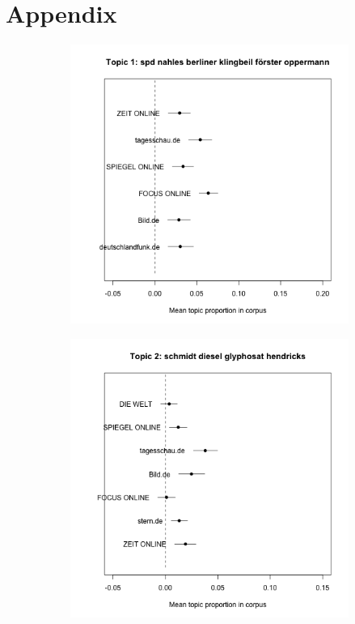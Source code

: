 \documentclass[12pt,a4paper,notitlepage]{article}
\begin{document}
\section*{Appendix}

\begin{figure}[H]
	\caption{Mean prevalence of topics within each news source corpus 1}
	\begin{center}
		\begin{subfigure}[normla]{0.2\textwidth}
			\includegraphics[width=\textwidth]{../figs/estimate_effect1.png}
		\end{subfigure}
		\begin{subfigure}[normla]{0.2\textwidth}
			\includegraphics[width=\textwidth]{../figs/estimate_effect2.png}

\end{subfigure}
\end{center}
\end{figure}
\end{document}
